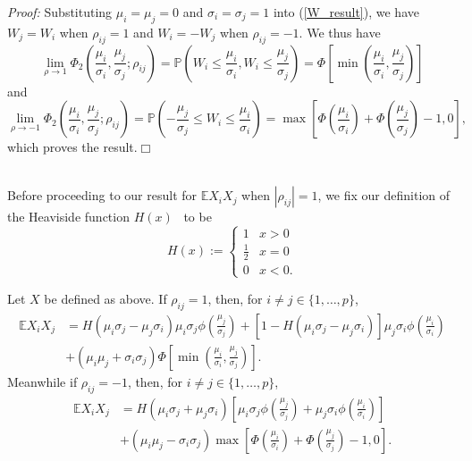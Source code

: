 \documentclass{article}
\newcommand{\EE}{\mathbb{E}}
\newcommand{\ra}{\rightarrow}
\begin{document}
\noindent \textit{Proof:} Substituting $\mu_i=\mu_j=0$ and $\sigma_i=\sigma_j=1$ into (\ref{W_result}), we have $W_j=W_i$ when $\rho_{ij}=1$ and $W_i=-W_j$ when $\rho_{ij}=-1$. We thus have
$$\lim_{\rho\ra 1}\Phi_2\left( \frac{\mu_i}{\sigma_i}, \frac{\mu_j}{\sigma_j}; \rho_{ij} \right)=\mathbb{P}\left(W_i\le \frac{\mu_i}{\sigma_i},W_i\le\frac{\mu_j}{\sigma_j}\right)=\Phi\left[\min\left(\frac{\mu_i}{\sigma_i},\frac{\mu_j}{\sigma_j}\right)\right]$$
and
$$\lim_{\rho\ra -1}\Phi_2\left( \frac{\mu_i}{\sigma_i}, \frac{\mu_j}{\sigma_j}; \rho_{ij} \right)=\mathbb{P}\left(-\frac{\mu_j}{\sigma_j}\le W_i\le \frac{\mu_i}{\sigma_i}\right)=\max\left[\Phi\left(\frac{\mu_i}{\sigma_i}\right)+\Phi\left(\frac{\mu_j}{\sigma_j}\right)-1,0\right],$$
which proves the result.\hfill $\Box$\\
$ $

Before proceeding to our result for $\EE X_i X_j$ when $|\rho_{ij}|=1$, we fix our definition of the Heaviside function $H(x)$~\cite{hoskins2009delta} to be
$$H(x):=\left\{\begin{array}{ll}1&x>0\\
\frac{1}{2}&x=0\\0&x<0.\end{array}\right.$$

\begin{theorem}\label{rho1}
Let $X$ be defined as above. If $\rho_{ij}=1$, then, for $i \neq j \in \{1,\ldots,p\}$,
\begin{align}\EE X_i X_j&=H(\mu_i\sigma_j-\mu_j\sigma_i)\mu_i \sigma_j \phi \left( \frac{\mu_j}{\sigma_j} \right)+[1-H(\mu_i\sigma_j-\mu_j\sigma_i)]\mu_j \sigma_i \phi \left( \frac{\mu_i}{\sigma_i}\right)\nonumber\\&+( \mu_i \mu_j + \sigma_i \sigma_j )\Phi\left[\min\left(\frac{\mu_i}{\sigma_i},\frac{\mu_j}{\sigma_j}\right)\right].\label{rho_plus1}\end{align}
Meanwhile if $\rho_{ij}=-1$, then, for $i \neq j \in \{1,\ldots,p\}$,
\begin{align}\EE X_i X_j&=H(\mu_i\sigma_j+\mu_j\sigma_i)\left[\mu_i \sigma_j \phi \left( \frac{\mu_j}{\sigma_j}\right) +\mu_j \sigma_i \phi \left( \frac{\mu_i}{\sigma_i}\right)\right]\nonumber\\&+( \mu_i \mu_j - \sigma_i \sigma_j )\max\left[\Phi\left(\frac{\mu_i}{\sigma_i}\right)+\Phi\left(\frac{\mu_j}{\sigma_j}\right)-1,0\right].\label{rho_minus1}\end{align}
\end{theorem}
\end{document}

